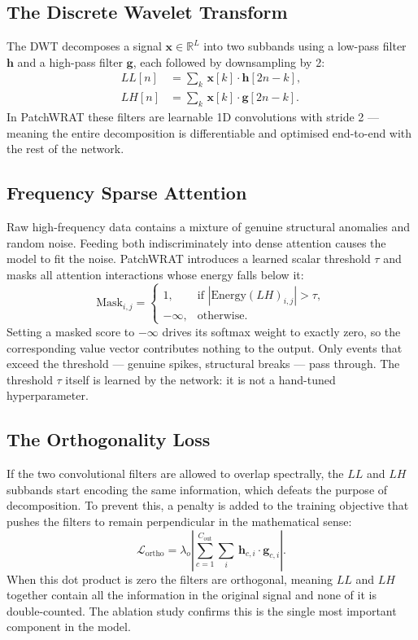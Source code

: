 \documentclass[11pt, letterpaper]{article}
\begin{document}
\subsection{The Discrete Wavelet Transform}

The DWT decomposes a signal $\mathbf{x} \in \mathbb{R}^L$ into two subbands using a low-pass
filter $\mathbf{h}$ and a high-pass filter $\mathbf{g}$, each followed by downsampling by 2:
\begin{align}
  LL[n] &= \sum_{k}\, \mathbf{x}[k]\cdot\mathbf{h}[2n-k], \\
  LH[n] &= \sum_{k}\, \mathbf{x}[k]\cdot\mathbf{g}[2n-k].
\end{align}
In PatchWRAT these filters are learnable 1D convolutions with stride 2 — meaning the entire
decomposition is differentiable and optimised end-to-end with the rest of the network.

\subsection{Frequency Sparse Attention}

Raw high-frequency data contains a mixture of genuine structural anomalies and random noise.
Feeding both indiscriminately into dense attention causes the model to fit the noise.
PatchWRAT introduces a learned scalar threshold $\tau$ and masks all attention interactions
whose energy falls below it:
\begin{equation}
  \text{Mask}_{i,j} =
  \begin{cases}
    1,         & \text{if } |\text{Energy}(LH)_{i,j}| > \tau, \\
    -\infty,   & \text{otherwise.}
  \end{cases}
\end{equation}
Setting a masked score to $-\infty$ drives its softmax weight to exactly zero, so the
corresponding value vector contributes nothing to the output. Only events that exceed the
threshold — genuine spikes, structural breaks — pass through. The threshold $\tau$ itself is
learned by the network: it is not a hand-tuned hyperparameter.

\subsection{The Orthogonality Loss}

If the two convolutional filters are allowed to overlap spectrally, the $LL$ and $LH$ subbands
start encoding the same information, which defeats the purpose of decomposition. To prevent
this, a penalty is added to the training objective that pushes the filters to remain
perpendicular in the mathematical sense:
\begin{equation}
  \mathcal{L}_{\text{ortho}} =
    \lambda_o \left| \sum_{c=1}^{C_{\text{out}}} \sum_{i}\, \mathbf{h}_{c,i}\cdot\mathbf{g}_{c,i} \right|.
\end{equation}
When this dot product is zero the filters are orthogonal, meaning $LL$ and $LH$ together
contain all the information in the original signal and none of it is double-counted. The
ablation study confirms this is the single most important component in the model.
\end{document}
